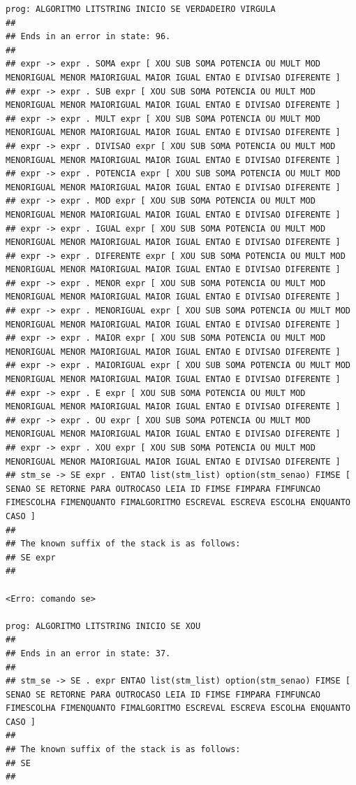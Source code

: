 \documentclass[hidelinks,12pt]{article}
\begin{document}
\begin{lstlisting}
prog: ALGORITMO LITSTRING INICIO SE VERDADEIRO VIRGULA 
##
## Ends in an error in state: 96.
##
## expr -> expr . SOMA expr [ XOU SUB SOMA POTENCIA OU MULT MOD MENORIGUAL MENOR MAIORIGUAL MAIOR IGUAL ENTAO E DIVISAO DIFERENTE ]
## expr -> expr . SUB expr [ XOU SUB SOMA POTENCIA OU MULT MOD MENORIGUAL MENOR MAIORIGUAL MAIOR IGUAL ENTAO E DIVISAO DIFERENTE ]
## expr -> expr . MULT expr [ XOU SUB SOMA POTENCIA OU MULT MOD MENORIGUAL MENOR MAIORIGUAL MAIOR IGUAL ENTAO E DIVISAO DIFERENTE ]
## expr -> expr . DIVISAO expr [ XOU SUB SOMA POTENCIA OU MULT MOD MENORIGUAL MENOR MAIORIGUAL MAIOR IGUAL ENTAO E DIVISAO DIFERENTE ]
## expr -> expr . POTENCIA expr [ XOU SUB SOMA POTENCIA OU MULT MOD MENORIGUAL MENOR MAIORIGUAL MAIOR IGUAL ENTAO E DIVISAO DIFERENTE ]
## expr -> expr . MOD expr [ XOU SUB SOMA POTENCIA OU MULT MOD MENORIGUAL MENOR MAIORIGUAL MAIOR IGUAL ENTAO E DIVISAO DIFERENTE ]
## expr -> expr . IGUAL expr [ XOU SUB SOMA POTENCIA OU MULT MOD MENORIGUAL MENOR MAIORIGUAL MAIOR IGUAL ENTAO E DIVISAO DIFERENTE ]
## expr -> expr . DIFERENTE expr [ XOU SUB SOMA POTENCIA OU MULT MOD MENORIGUAL MENOR MAIORIGUAL MAIOR IGUAL ENTAO E DIVISAO DIFERENTE ]
## expr -> expr . MENOR expr [ XOU SUB SOMA POTENCIA OU MULT MOD MENORIGUAL MENOR MAIORIGUAL MAIOR IGUAL ENTAO E DIVISAO DIFERENTE ]
## expr -> expr . MENORIGUAL expr [ XOU SUB SOMA POTENCIA OU MULT MOD MENORIGUAL MENOR MAIORIGUAL MAIOR IGUAL ENTAO E DIVISAO DIFERENTE ]
## expr -> expr . MAIOR expr [ XOU SUB SOMA POTENCIA OU MULT MOD MENORIGUAL MENOR MAIORIGUAL MAIOR IGUAL ENTAO E DIVISAO DIFERENTE ]
## expr -> expr . MAIORIGUAL expr [ XOU SUB SOMA POTENCIA OU MULT MOD MENORIGUAL MENOR MAIORIGUAL MAIOR IGUAL ENTAO E DIVISAO DIFERENTE ]
## expr -> expr . E expr [ XOU SUB SOMA POTENCIA OU MULT MOD MENORIGUAL MENOR MAIORIGUAL MAIOR IGUAL ENTAO E DIVISAO DIFERENTE ]
## expr -> expr . OU expr [ XOU SUB SOMA POTENCIA OU MULT MOD MENORIGUAL MENOR MAIORIGUAL MAIOR IGUAL ENTAO E DIVISAO DIFERENTE ]
## expr -> expr . XOU expr [ XOU SUB SOMA POTENCIA OU MULT MOD MENORIGUAL MENOR MAIORIGUAL MAIOR IGUAL ENTAO E DIVISAO DIFERENTE ]
## stm_se -> SE expr . ENTAO list(stm_list) option(stm_senao) FIMSE [ SENAO SE RETORNE PARA OUTROCASO LEIA ID FIMSE FIMPARA FIMFUNCAO FIMESCOLHA FIMENQUANTO FIMALGORITMO ESCREVAL ESCREVA ESCOLHA ENQUANTO CASO ]
##
## The known suffix of the stack is as follows:
## SE expr 
##

<Erro: comando se>

prog: ALGORITMO LITSTRING INICIO SE XOU 
##
## Ends in an error in state: 37.
##
## stm_se -> SE . expr ENTAO list(stm_list) option(stm_senao) FIMSE [ SENAO SE RETORNE PARA OUTROCASO LEIA ID FIMSE FIMPARA FIMFUNCAO FIMESCOLHA FIMENQUANTO FIMALGORITMO ESCREVAL ESCREVA ESCOLHA ENQUANTO CASO ]
##
## The known suffix of the stack is as follows:
## SE 
##


\end{lstlisting}
\end{document}
